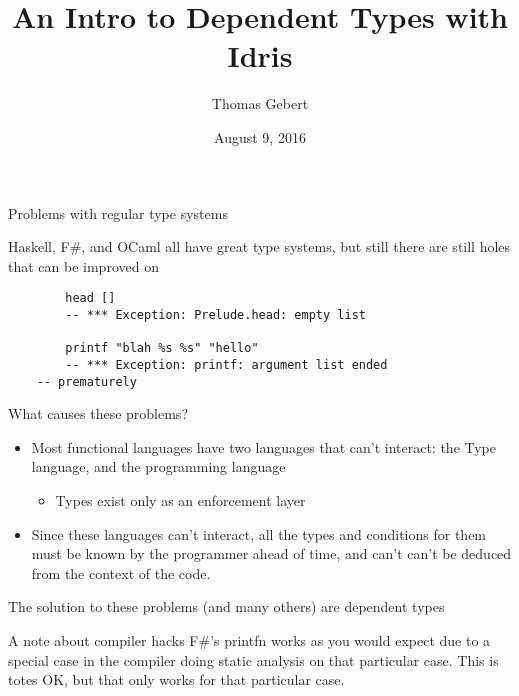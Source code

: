 \documentclass{beamer}
\title{An Intro to Dependent Types with Idris}
\subtitle{}
\author{Thomas Gebert}
\date{August 9, 2016}
\begin{document}
  \frame{\titlepage}
\begin{frame}[fragile]{Problems with regular type systems}
	
 	\transdissolve
	Haskell, F\#, and OCaml all have great type systems, but still there are still holes that can be improved on
	\begin{lstlisting}
		head []
		-- *** Exception: Prelude.head: empty list

		printf "blah %s %s" "hello"
		-- *** Exception: printf: argument list ended 
    -- prematurely
	\end{lstlisting}

\end{frame}
  \begin{frame}{What causes these problems?}
 		\transdissolve
	  \begin{itemize}
		\item Most functional languages have two languages that can't interact: the Type language, and the programming language \begin{itemize}
			\item Types exist only as an enforcement layer
			\end{itemize}
		\item Since these languages can't interact, all the types and conditions for them must be known by the programmer ahead of time, and can't can't be deduced from the context of the code.
	  \end{itemize}
  \end{frame}
\begin{frame}
\begin{center}
 		\transdissolve
 The solution to these problems (and many others) are dependent types
\end{center}
\end{frame}
\begin{frame}{A note about compiler hacks}
 		\transdissolve
  F\#'s printfn works as you would expect due to a special case in the compiler doing static analysis on that particular case. 
  \linebreak
  \linebreak
  This is totes OK, but that only works for that particular case.
\end{frame}
\end{document}
